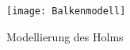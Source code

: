 \begin{figure}
	\texttt{[image: Balkenmodell]}
	\caption{Modellierung des Holms}
	\label{fig:Holmmodellierung}
\end{figure}